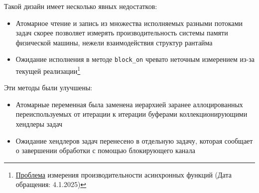 Такой дизайн имеет несколько явных недостатков:

\begin{itemize}
    \item Атомарное чтение и запись из множества исполняемых разными потоками задач скорее позволяет измерять производительность системы памяти физической машины, нежели взаимодействия структур рантайма
    \item Ожидание исполнения в методе \verb|block_on| чревато неточным измерением из-за текущей реализации\footnote{\href{https://github.com/bheisler/criterion.rs/issues/819}{Проблема} измерения производительности асинхронных функций (Дата обращения: 4.1.2025)}
\end{itemize}

Эти методы были улучшены:

\begin{itemize}
    \item Атомарные переменная была заменена иерархией заранее аллоцированных переиспользуемых от итерации к итерации буферами коллекционирующими хендлеры задач
    \item Ожидание хендлеров задач перенесено в отдельную задачу, которая сообщает о завершении обработки с помощью блокирующего канала
\end{itemize}
